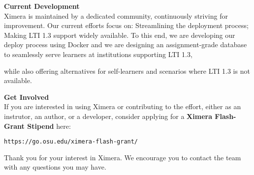 \documentclass[twocolumn]{article}
\begin{document}
    \begin{xframe}
        {\sffamily\bfseries Current Development}\\
        Ximera is maintained by a dedicated community, continuously striving
        for
        improvement. Our current efforts focus on: Streamlining the deployment
        process; Making LTI 1.3 support widely available. To this end, we are
        developing our
        deploy process using Docker and we are designing an assignment-grade
        database
        to
        seamlessly serve  learners at institutions supporting LTI 1.3,
        \begin{center}
        \end{center}
        while also offering alternatives for self-learners and scenarios where
        LTI
        1.3 is not
        available.
    \end{xframe}
    \begin{xframe}
        {\sffamily\bfseries Get Involved}\\
        If you are interested in using Ximera or contributing to the effort,
        either
        as an instrutor, an author, or a developer, consider
        applying for a \textbf{Ximera Flash-Grant Stipend} here:
        \begin{center}
            \tt  https://go.osu.edu/ximera-flash-grant/
        \end{center}
        Thank you for your interest in Ximera. We encourage you
        to contact the team with  any questions you may have.
    \end{xframe}
\end{document}
